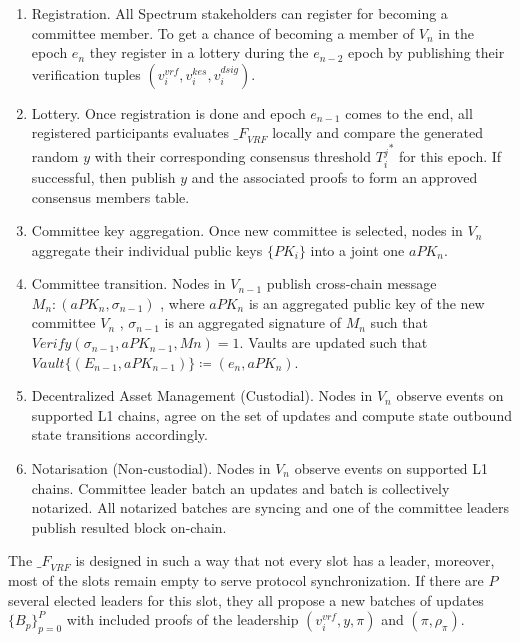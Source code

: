 \begin{enumerate}
    \item Registration.
    All Spectrum stakeholders can register for becoming a committee member.
    To get a chance of becoming a member of $V_n$ in the epoch $e_n$ they register in a lottery during the $e_{n-2}$
    epoch by publishing their verification tuples ${(v_i^{vrf}, v_i^{kes}, v_i^{dsig})}$.
    \item Lottery.
    Once registration is done and epoch $e_{n-1}$ comes to the end, all registered participants evaluates
    ${\mathcal_{F}}_{VRF}$ locally and compare the generated random $y$ with their corresponding consensus threshold
    ${T_i^j}^*$ for this epoch.
    If successful, then publish $y$ and the associated proofs to form an approved consensus members table.
    \item Committee key aggregation.
    Once new committee is selected, nodes in $V_n$ aggregate their individual public keys $\{PK_i\}$ into
    a joint one $aPK_n$.
    \item Committee transition.
    Nodes in $V_{n-1}$ publish cross-chain message ${M_n : (aPK_n, \sigma_{n-1})}$ , where $aPK_n$ is
    an aggregated public key of the new committee $V_n$ , $\sigma_{n-1}$ is an aggregated signature of
    $M_n$ such that ${Verify(\sigma_{n-1}, aPK_{n-1}, Mn) = 1}$.
    Vaults are updated such that ${Vault\{(E_{n-1}, aPK_{n-1})\} \coloneqq (e_n, aPK_n)}$.
    \item Decentralized Asset Management (Custodial).
    Nodes in $V_n$ observe events on supported L1 chains, agree on the set of updates
    and compute state outbound state transitions accordingly.
    \item Notarisation (Non-custodial).
    Nodes in $V_n$ observe events on supported L1 chains.
    Committee leader batch an updates and batch is collectively notarized.
    All notarized batches are syncing and one of the committee leaders publish resulted block on-chain.
\end{enumerate}

\item The ${\mathcal_{F}}_{VRF}$ is designed in such a way that not every slot has a leader, moreover, most of the slots remain empty to serve protocol synchronization.
If there are $P$ several elected leaders for this slot, they all propose a new batches of updates $\{B_p\}_{p=0}^P$ with included proofs of the leadership ${(v_i^{vrf}, y, \pi)}$ and
${(\pi, \rho_\pi)}$.
